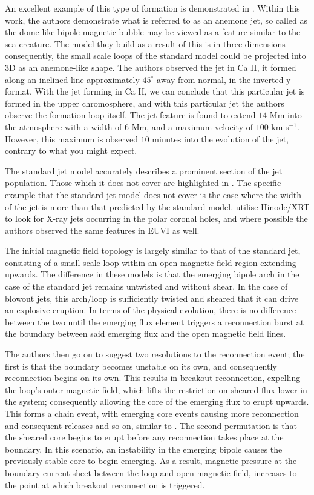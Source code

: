An excellent example of this type of formation is demonstrated in \cite{Nishizuka2011}.
Within this work, the authors demonstrate what is referred to as an anemone jet, so called as the dome-like bipole magnetic bubble may be viewed as a feature similar to the sea creature.
The model they build as a result of this is in three dimensions - consequently, the small scale loops of the standard model could be projected into $3$D as an anemone-like shape.
The authors observed the jet in Ca II, it formed along an inclined line approximately $45^\circ$ away from normal, in the inverted-y format.
With the jet forming in Ca II, we can conclude that this particular jet is formed in the upper chromosphere, and with this particular jet the authors observe the formation loop itself.
The jet feature is found to extend $14$ Mm into the atmosphere with a width of $6$ Mm, and a maximum velocity of $100$ km s$^{-1}$.
However, this maximum is observed $10$ minutes into the evolution of the jet, contrary to what you might expect.

The standard jet model accurately describes a prominent section of the jet population.
Those which it does not cover are highlighted in \cite{Moore2010}.
The specific example that the standard jet model does not cover is the case where the width of the jet is more than that predicted by the standard model.
\cite{Moore2010} utilise Hinode/XRT to look for X-ray jets occurring in the polar coronal holes, and where possible the authors observed the same features in EUVI as well.

The initial magnetic field topology is largely similar to that of the standard jet, consisting of a small-scale loop within an open magnetic field region extending upwards.
The difference in these models is that the emerging bipole arch in the case of the standard jet remains untwisted and without shear.
In the case of blowout jets, this arch/loop is sufficiently twisted and sheared that it can drive an explosive eruption.
In terms of the physical evolution, there is no difference between the two until the emerging flux element triggers a reconnection burst at the boundary between said emerging flux and the open magnetic field lines.

The authors then go on to suggest two resolutions to the reconnection event; the first is that the boundary becomes unstable on its own, and consequently reconnection begins on its own.
This results in breakout reconnection, expelling the loop's outer magnetic field, which lifts the restriction on sheared flux lower in the system; consequently allowing the core of the emerging flux to erupt upwards.
This forms a chain event, with emerging core events causing more reconnection and consequent releases and so on, similar to \cite{Antiochos1998}.
The second permutation is that the sheared core begins to erupt before any reconnection takes place at the boundary.
In this scenario, an instability in the emerging bipole causes the previously stable core to begin emerging.
As a result, magnetic pressure at the boundary current sheet between the loop and open magnetic field, increases to the point at which breakout reconnection is triggered.

